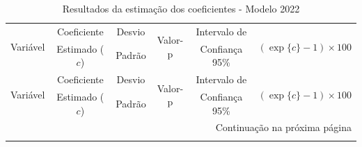 \documentclass[12pt,a4paper,header]{abnt}
\begin{document}
\begin{center}
\small
\begin{longtable}{lccccc}
\caption{Resultados da estimação dos coeficientes - Modelo 2022}
\label{tab:resultados_2022} \\
\toprule
\multirow{2}{*}{Variável} & Coeficiente & Desvio & \multirow{2}{*}{Valor-p} & Intervalo de & \multirow{2}{*}{$(\exp\{c\}-1)\times 100$} \\
& Estimado ($c$) & Padrão & & Confiança 95\% & \\
\midrule
\endfirsthead

\toprule
\multirow{2}{*}{Variável} & Coeficiente & Desvio & \multirow{2}{*}{Valor-p} & Intervalo de & \multirow{2}{*}{$(\exp\{c\}-1)\times 100$} \\
& Estimado ($c$) & Padrão & & Confiança 95\% & \\
\midrule
\endhead

\midrule
\multicolumn{6}{r}{\small Continuação na próxima página} \\
\midrule
\endfoot

\bottomrule
\endlastfoot


\end{longtable}
\end{center}
\end{document}
